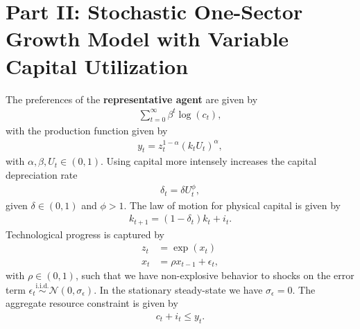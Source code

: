 \documentclass[a4paper]{article}
\theoremstyle{definition}
\begin{document}
\section{Part II: Stochastic One-Sector Growth Model with Variable Capital Utilization}
The preferences of the \textbf{representative agent} are given by
	\begin{align*}
	\sum\limits_{t=0}^{\infty} \beta^t \log(c_t) ,
	\end{align*} 
with the production function given by
	\begin{align*}
	y_t = z_t^{1-\alpha}(k_t U_t)^\alpha,
	\end{align*}	
with $\alpha,\beta,U_t \in (0,1)$. Using capital more intensely increases the capital depreciation rate
	\begin{align*}
	\delta_t = \delta U_t^\phi,
	\end{align*}	
given $\delta \in (0,1)$ and $\phi > 1$. The law of motion for physical capital is given by
	\begin{align*}
	k_{t+1} = (1-\delta_t)k_t + i_t.
	\end{align*}	
Technological progress is captured by
	\begin{align*}
	z_t 	&= \exp (x_t) \\
	x_t 	&= \rho x_{t-1} + \epsilon_t,
	\end{align*}	
with $\rho \in (0,1)$, such that we have non-explosive behavior to shocks on the error term $\epsilon_t \overset{\text{i.i.d.}}{\sim} \mathcal N(0,\sigma_\epsilon)$. In the stationary steady-state we have $\sigma_\epsilon = 0$. The aggregate resource constraint is given by
	\begin{align*}
	c_t + i_t \leq y_t.
	\end{align*}
\end{document}
